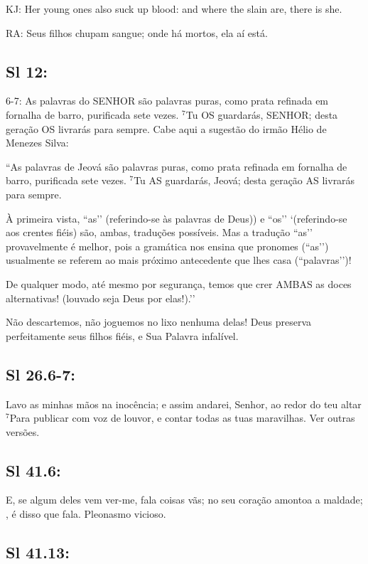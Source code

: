 KJ: Her young ones also suck up blood: and where the slain are, there is she.

RA: Seus filhos chupam sangue; onde há mortos, ela aí está.

\subsection{Sl 12:}

6-7: As palavras do SENHOR são palavras puras, como prata refinada em fornalha de barro, purificada sete vezes. $^{\mathrm{7}}$Tu OS guardarás, SENHOR; desta geração OS livrarás para sempre.
Cabe aqui a sugestão do irmão Hélio de Menezes Silva:

``As palavras de Jeová são palavras puras, como prata refinada em fornalha de barro, purificada sete vezes. $^{\mathrm{7}}$Tu AS guardarás, Jeová; desta geração AS livrarás para sempre.

À primeira vista, ``as’’ (referindo-se às palavras de Deus)) e ``os’’
`(referindo-se aos crentes fiéis) são, ambas, traduções possíveis. Mas a
tradução ``as’’ provavelmente é melhor, pois a gramática nos ensina que
pronomes (``as’’) usualmente se referem ao mais próximo antecedente que
lhes casa (``palavras’’)!

De qualquer modo, até mesmo por segurança, temos que crer AMBAS as doces alternativas! (louvado seja Deus por elas!).’’

Não descartemos, não joguemos no lixo nenhuma delas! Deus preserva perfeitamente seus filhos fiéis, e Sua Palavra infalível.

\subsection{Sl 26.6-7:}

 Lavo as minhas mãos na inocência; e assim andarei, Senhor, ao redor do teu altar $^{\mathrm{7}}$Para publicar com voz de louvor, e contar todas as tuas maravilhas.
Ver outras versões. 

\subsection{Sl 41.6:}

 E, se algum deles vem ver-me, fala coisas vãs; no seu coração amontoa a maldade; , é disso que fala.
Pleonasmo vicioso.

\subsection{Sl 41.13:}


